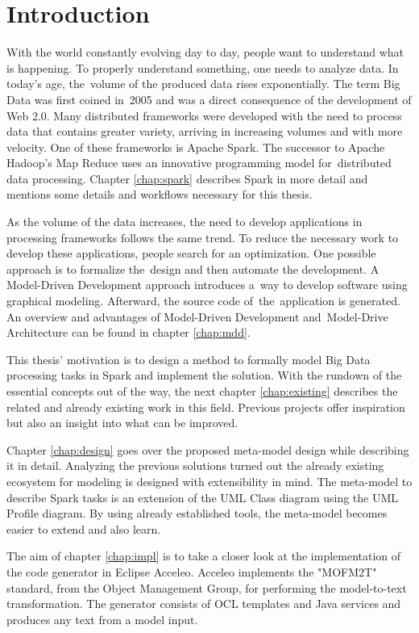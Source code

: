 
\chapter{Introduction}

With the world constantly evolving day to day, people want to understand what is happening. To properly understand something, one needs to analyze data. In today's age, the~volume of the produced data rises exponentially. The term Big Data was first coined in~2005 and was a direct consequence of the development of Web 2.0. Many distributed frameworks were developed with the need to process data that contains greater variety, arriving in increasing volumes and with more velocity. One of these frameworks is Apache Spark. The successor to Apache Hadoop's Map Reduce uses an innovative programming model for~distributed data processing. Chapter \ref{chap:spark} describes Spark in more detail and mentions some details and workflows necessary for this thesis. 

As the volume of the data increases, the need to develop applications in processing frameworks follows the same trend. To reduce the necessary work to develop these applications, people search for an optimization. One possible approach is to formalize the~design and then automate the development. A Model-Driven Development approach introduces a~way to develop software using graphical modeling. Afterward, the source code of~the~application is generated. An overview and advantages of Model-Driven Development and~Model-Drive Architecture can be found in chapter \ref{chap:mdd}.

This thesis' motivation is to design a method to formally model Big Data processing tasks in Spark and implement the solution. With the rundown of the essential concepts out of the way, the next chapter \ref{chap:existing} describes the related and already existing work in this field. Previous projects offer inspiration but also an insight into what can be improved. 

Chapter \ref{chap:design} goes over the proposed meta-model design while describing it in detail. Analyzing the previous solutions turned out the already existing ecosystem for modeling is designed with extensibility in mind. The meta-model to describe Spark tasks is an extension of the UML Class diagram using the UML Profile diagram. By using already established tools, the meta-model becomes easier to extend and also learn. 

The aim of chapter \ref{chap:impl} is to take a closer look at the implementation of the code generator in Eclipse Acceleo. Acceleo implements the "MOFM2T" standard, from the Object Management Group, for performing the model-to-text transformation. The generator consists of OCL templates and Java services and produces any text from a model input.

